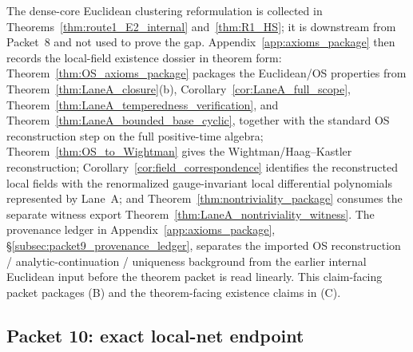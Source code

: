 The dense-core Euclidean clustering reformulation is collected in Theorems~\ref{thm:route1_E2_internal} and~\ref{thm:R1_HS}; it is downstream from Packet~8 and not used to prove the gap.
Appendix~\ref{app:axioms_package} then records the local-field existence dossier in theorem form: Theorem~\ref{thm:OS_axioms_package} packages the Euclidean/OS properties from Theorem~\ref{thm:LaneA_closure}(b), Corollary~\ref{cor:LaneA_full_scope}, Theorem~\ref{thm:LaneA_temperedness_verification}, and Theorem~\ref{thm:LaneA_bounded_base_cyclic}, together with the standard OS reconstruction step on the full positive-time algebra; Theorem~\ref{thm:OS_to_Wightman} gives the Wightman/Haag--Kastler reconstruction; Corollary~\ref{cor:field_correspondence} identifies the reconstructed local fields with the renormalized gauge-invariant local differential polynomials represented by Lane~A; and Theorem~\ref{thm:nontriviality_package} consumes the separate witness export Theorem~\ref{thm:LaneA_nontriviality_witness}. The provenance ledger in Appendix~\ref{app:axioms_package}, \S\ref{subsec:packet9_provenance_ledger}, separates the imported OS reconstruction / analytic-continuation / uniqueness background from the earlier internal Euclidean input before the theorem packet is read linearly.
This claim-facing packet packages (B) and the theorem-facing existence claims in (C).

\subsection{Packet 10: exact local-net endpoint}

